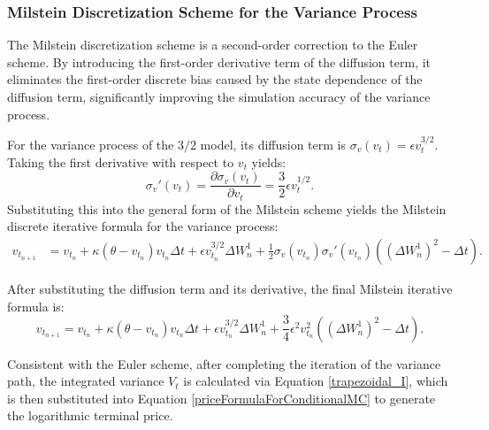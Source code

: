 \subsubsection{Milstein Discretization Scheme for the Variance Process}
The Milstein discretization scheme is a second-order correction to the Euler scheme. By introducing the first-order derivative term of the diffusion term, it eliminates the first-order discrete bias caused by the state dependence of the diffusion term, significantly improving the simulation accuracy of the variance process.

For the variance process of the $3/2$ model, its diffusion term is $\sigma_v(v_t) = \epsilon v_t^{3/2}$. Taking the first derivative with respect to $v_t$ yields:
\begin{equation}
  \sigma_v'(v_t) = \frac{\partial \sigma_v(v_t)}{\partial v_t} = \frac{3}{2}\epsilon v_t^{1/2}.
\end{equation}
Substituting this into the general form of the Milstein scheme yields the Milstein discrete iterative formula for the variance process:
\begin{equation}
  \begin{aligned}
    v_{t_{n+1}} &= v_{t_n} + \kappa(\theta - v_{t_n})v_{t_n}\Delta t + \epsilon v_{t_n}^{3/2}\Delta W_n^1 + \frac{1}{2}\sigma_v(v_{t_n})\sigma_v'(v_{t_n})\left((\Delta W_n^1)^2 - \Delta t\right).
  \end{aligned}
\end{equation}

After substituting the diffusion term and its derivative, the final Milstein iterative formula is:
\begin{equation}
  v_{t_{n+1}} = v_{t_n} + \kappa(\theta - v_{t_n})v_{t_n}\Delta t + \epsilon v_{t_n}^{3/2}\Delta W_n^1 + \frac{3}{4}\epsilon^2 v_{t_n}^2\left((\Delta W_n^1)^2 - \Delta t\right).
  \label{milstein_v}
\end{equation}

Consistent with the Euler scheme, after completing the iteration of the variance path, the integrated variance $V_t$ is calculated via Equation \eqref{trapezoidal_I}, which is then substituted into Equation \eqref{priceFormulaForConditionalMC} to generate the logarithmic terminal price.

